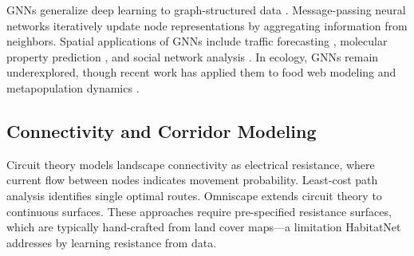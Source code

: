 GNNs generalize deep learning to graph-structured data
\citep{kipf2017semi, velickovic2018graph}. Message-passing neural
networks \citep{gilmer2017neural} iteratively update node representations
by aggregating information from neighbors. Spatial applications of GNNs
include traffic forecasting \citep{li2018diffusion}, molecular property
prediction \citep{duvenaud2015convolutional}, and social network analysis
\citep{hamilton2017inductive}. In ecology, GNNs remain underexplored,
though recent work has applied them to food web modeling
\citep{strydom2021graph} and metapopulation dynamics
\citep{mcinerny2022graph}.

\subsection{Connectivity and Corridor Modeling}

Circuit theory \citep{mcrae2006isolation, mcrae2008using} models
landscape connectivity as electrical resistance, where current flow
between nodes indicates movement probability. Least-cost path analysis
\citep{adriaensen2003application} identifies single optimal routes.
Omniscape \citep{landau2021omnidirectional} extends circuit theory to
continuous surfaces. These approaches require pre-specified resistance
surfaces, which are typically hand-crafted from land cover maps---a
limitation HabitatNet addresses by learning resistance from data.


